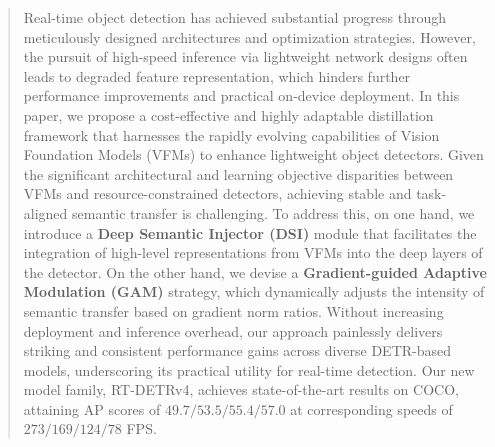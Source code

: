 \begin{abstract}
Real-time object detection has achieved substantial progress through meticulously designed architectures and optimization strategies. 
However, the pursuit of high-speed inference via lightweight network designs often leads to degraded feature representation, which hinders further performance improvements and practical on-device deployment. 
In this paper, we propose a cost-effective and highly adaptable distillation framework that harnesses the rapidly evolving capabilities of Vision Foundation Models (VFMs) to enhance lightweight object detectors. 
Given the significant architectural and learning objective disparities between VFMs and resource-constrained detectors, achieving stable and task-aligned semantic transfer is challenging. To address this, on one hand, we introduce a \textbf{Deep Semantic Injector (DSI)} module that facilitates the integration of high-level representations from VFMs into the deep layers of the detector. On the other hand, we devise a \textbf{Gradient-guided Adaptive Modulation (GAM)} strategy, which dynamically adjusts the intensity of semantic transfer based on gradient norm ratios. Without increasing deployment and inference overhead, our approach painlessly delivers striking and consistent performance gains across diverse DETR-based models, underscoring its practical utility for real-time detection. 
Our new model family, RT-DETRv4, achieves state-of-the-art results on COCO, attaining AP scores of $49.7/53.5/55.4/57.0$ at corresponding speeds of $273/169/124/78$ FPS.
\end{abstract}